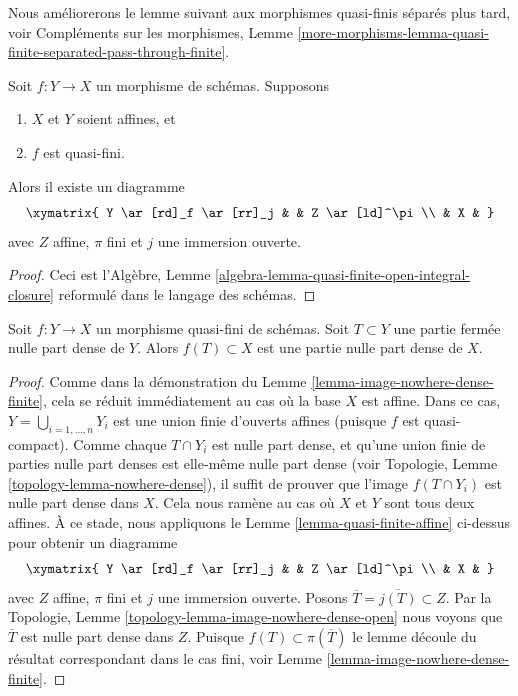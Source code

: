 \noindent
Nous améliorerons le lemme suivant aux morphismes
quasi-finis séparés
plus tard,
voir Compléments sur les morphismes, Lemme \ref{more-morphisms-lemma-quasi-finite-separated-pass-through-finite}.

\begin{lemma}
\label{lemma-quasi-finite-affine}
Soit $f : Y \to X$ un morphisme de schémas.
Supposons
\begin{enumerate}
\item $X$ et $Y$ soient affines, et
\item $f$ est quasi-fini.
\end{enumerate}
Alors il existe un diagramme
$$
\xymatrix{
Y \ar[rd]_f \ar[rr]_j & & Z \ar[ld]^\pi \\
& X &
}
$$
avec $Z$ affine, $\pi$ fini et $j$ une immersion ouverte.
\end{lemma}

\begin{proof}
Ceci
est l'Algèbre, Lemme \ref{algebra-lemma-quasi-finite-open-integral-closure} reformulé dans
le langage des schémas.
\end{proof}

\begin{lemma}
\label{lemma-image-nowhere-dense-quasi-finite}
Soit $f : Y \to X$ un morphisme quasi-fini de schémas. Soit $T \subset Y$
une partie fermée nulle part dense de $Y$. Alors $f(T) \subset X$
est une partie nulle part dense de $X$.
\end{lemma}

\begin{proof}
Comme dans la démonstration du Lemme \ref{lemma-image-nowhere-dense-finite}, cela se réduit immédiatement
au cas où la base $X$ est affine. Dans ce cas,
$Y = \bigcup_{i = 1, \ldots, n} Y_i$ est une union finie d'ouverts affines (puisque $f$
est quasi-compact). Comme chaque $T \cap Y_i$ est nulle part dense,
et qu'une union finie de parties nulle part denses est elle-même
nulle part dense (voir
Topologie, Lemme \ref{topology-lemma-nowhere-dense}), il suffit de prouver
que l'image $f(T \cap Y_i)$ est nulle part dense dans $X$. Cela nous ramène
au cas où $X$ et $Y$ sont tous deux affines. À ce stade, nous
appliquons le Lemme \ref{lemma-quasi-finite-affine} ci-dessus pour obtenir un diagramme
$$
\xymatrix{
Y \ar[rd]_f \ar[rr]_j & & Z \ar[ld]^\pi \\
& X &
}
$$
avec $Z$ affine, $\pi$ fini et $j$
une immersion ouverte. Posons $\overline{T} = \overline{j(T)} \subset Z$.
Par la Topologie, Lemme \ref{topology-lemma-image-nowhere-dense-open} nous voyons
que $\overline{T}$ est nulle part dense
dans $Z$. Puisque $f(T) \subset \pi(\overline{T})$
le lemme découle du résultat correspondant dans
le cas fini, voir Lemme \ref{lemma-image-nowhere-dense-finite}.
\end{proof}




